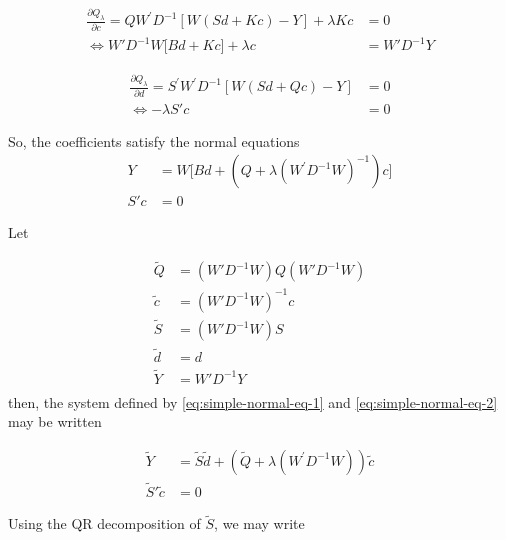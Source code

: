 \documentclass[12pt]{article}
\newcommand{\tildec}{\tilde{c}}
\newcommand{\tildeS}{\tilde{S}}
\newcommand{\tilded}{\tilde{d}}
\newcommand{\tildeY}{\tilde{Y}}
\newcommand{\tildeQ}{\tilde{Q}}
\theoremstyle{definition}
\begin{document}
\begin{align}
\frac{\partial Q_\lambda}{\partial c} = Q W^\prime D^{-1}\left[ W\left(Sd + Kc\right) - Y  \right] + \lambda Kc &= 0 \nonumber \\
\iff    W'D^{-1} W \bigg[ Bd + Kc \bigg] + \lambda c  &= W' D^{-1}Y \label{eq:normal-eq-1}
\end{align}
\noindent

\begin{align*}
\frac{\partial Q_\lambda}{\partial d} = S^\prime W^\prime D^{-1}\left[ W\left(Sd + Qc\right) - Y  \right] &=0 \nonumber \\
\iff   - \lambda S' c  &= 0  
\end{align*}
\bigskip
\noindent

So, the coefficients satisfy the normal equations
\begin{align} 
Y &= W \bigg[ Bd + \left(Q  + \lambda \left(W^\prime D^{-1} W \right)^{-1} \right) c \bigg] \label{eq:simple-normal-eq-1} \\
S' c  &= 0  \label{eq:simple-normal-eq-2}
\end{align}
\noindent

Let 

\begin{align*}
\tildeQ &= \left(W'D^{-1}W\right) Q \left(W'D^{-1}W\right)\\
 \tildec &= \left(W'D^{-1}W\right)^{-1}c\\
\tildeS &= \left(W'D^{-1}W\right)S\\ 
\tilded &= d\\
\tildeY &= W'D^{-1}Y\\
\end{align*}
\bigskip
\noindent
then, the system defined by  \ref{eq:simple-normal-eq-1} and \ref{eq:simple-normal-eq-2} may be written

\begin{align} 
\tildeY &= \tildeS \tilded + \left(\tildeQ  + \lambda \left(W^\prime D^{-1} W \right) \right) \tildec \label{eq:transform-normal-eq-1} \\
\tildeS' \tildec  &= 0  \label{eq:transform-normal-eq-2}
\end{align}

Using the QR decomposition of $\tildeS$, we may write 
\end{document}
